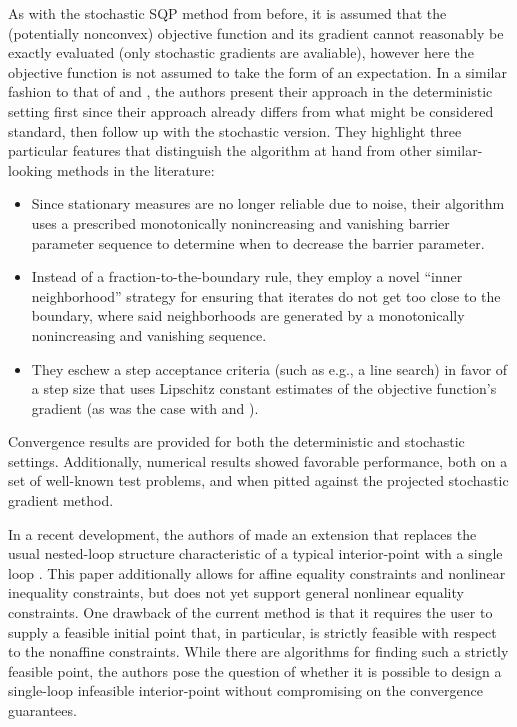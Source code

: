 \documentclass[12pt]{article}
\newcommand{\1}{\scalebox{1.06}{\ensuremath{\mathrel{\mathmybb{1}}}}}
\theoremstyle{definition}
\begin{document}
As with the stochastic SQP method from before, it is assumed that the (potentially nonconvex) objective function and its gradient cannot reasonably be exactly evaluated (only stochastic gradients are avaliable), however here the objective function is not assumed to take the form of an expectation.
	In a similar fashion to that of \cite{stochasticSQP} and \cite{almostSurely}, the authors present their approach in the deterministic setting first since their approach already differs from what might be considered standard, then follow up with the stochastic version. They highlight three particular features that distinguish the algorithm at hand from other similar-looking methods in the literature:
\begin{itemize}
	\item Since stationary measures are no longer reliable due to noise, their algorithm uses a prescribed monotonically nonincreasing and vanishing barrier parameter sequence to determine when to decrease the barrier parameter.
	\item Instead of a fraction-to-the-boundary rule, they employ a novel ``inner neighborhood'' strategy for ensuring that iterates do not get too close to the boundary, where said neighborhoods are generated by a monotonically nonincreasing and vanishing sequence.
	\item They eschew a step acceptance criteria (such as e.g., a line search) in favor of a step size that uses Lipschitz constant estimates of the objective function's gradient (as was the case with \cite{stochasticSQP} and \cite{almostSurely}).
\end{itemize}
Convergence results are provided for both the deterministic and stochastic settings.
Additionally, numerical results showed favorable performance, both on a set of well-known test problems, and when pitted against the projected stochastic gradient method.
\newline

In a recent development, the
authors of \cite{interiorPoint} made an extension that replaces the usual nested-loop structure characteristic of a typical interior-point with a single loop \cite{singleLoop}. This paper additionally allows for affine equality constraints and nonlinear inequality constraints, but does not yet support general nonlinear equality constraints.
One drawback of the current method is that it requires the user to supply a feasible initial point that, in particular, is strictly feasible with respect to the nonaffine constraints. While there are algorithms for finding such a strictly feasible point, the authors pose the question of whether it is possible to design a single-loop infeasible interior-point without compromising on the convergence guarantees.
\end{document}
